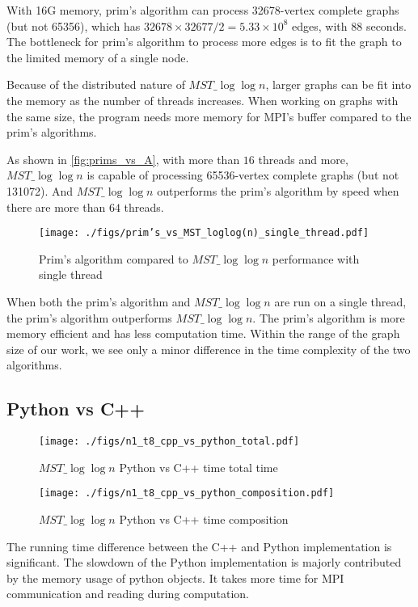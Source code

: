 \documentclass[english, 12pt, a4paper, elec, utf8, a-2b, online]{aaltothesis}
\newcommand{\mstalgo}{$MST\_\log\log{n}$}
\begin{document}
With 16G memory, prim's algorithm can process 32678-vertex complete graphs (but not 65356), which has $32678 \times 32677 / 2 = 5.33 \times 10 ^ 8$ edges, with 88 seconds. The bottleneck for prim's algorithm to process more edges is to fit the graph to the limited memory of a single node.

Because of the distributed nature of \mstalgo{}, larger graphs can be fit into the memory as the number of threads increases. When working on graphs with the same size, the program needs more memory for MPI's buffer compared to the prim's algorithms.

As shown in \cref{fig:prims_vs_A}, with more than $16$ threads and more, \mstalgo{} is capable of processing 65536-vertex complete graphs (but not 131072). And \mstalgo{} outperforms the prim's algorithm by speed when there are more than $64$ threads.

\begin{figure}[h]
	\centering
		\texttt{[image: ./figs/prim's\_vs\_MST\_loglog(n)\_single\_thread.pdf]}
	\caption{Prim's algorithm compared to \mstalgo{} performance with single thread}
	\label{fig:prim's_vs_A_single_thread.pdf}
\end{figure}

When both the prim's algorithm and \mstalgo{} are run on a single thread, the prim's algorithm outperforms \mstalgo{}. The prim's algorithm is more memory efficient and has less computation time. Within the range of the graph size of our work, we see only a minor difference in the time complexity of the two algorithms.
\subsection{Python vs C++}


\begin{figure}[h]
	\centering
		\texttt{[image: ./figs/n1\_t8\_cpp\_vs\_python\_total.pdf]}
	\caption{\mstalgo{} Python vs C++ time total time}
	\label{fig:python_cpp_mpi_total.pdf}
\end{figure}

\begin{figure}[h]
	\centering
		\texttt{[image: ./figs/n1\_t8\_cpp\_vs\_python\_composition.pdf]}
	\caption{\mstalgo{} Python vs C++ time composition}
	\label{fig:python_cpp_mpi.pdf}
\end{figure}

The running time difference between the C++ and Python implementation is significant. The slowdown of the Python implementation is majorly contributed by the memory usage of python objects. It takes more time for MPI communication and reading during computation.
\end{document}
